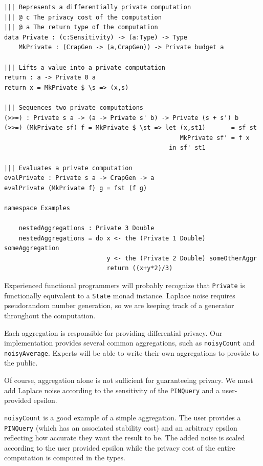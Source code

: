 \documentclass[12pt]{article}
\begin{document}
\begin{lstlisting}
||| Represents a differentially private computation
||| @ c The privacy cost of the computation
||| @ a The return type of the computation
data Private : (c:Sensitivity) -> (a:Type) -> Type
    MkPrivate : (CrapGen -> (a,CrapGen)) -> Private budget a

||| Lifts a value into a private computation
return : a -> Private 0 a
return x = MkPrivate $ \s => (x,s)

||| Sequences two private computations
(>>=) : Private s a -> (a -> Private s' b) -> Private (s + s') b
(>>=) (MkPrivate sf) f = MkPrivate $ \st => let (x,st1)       = sf st
                                                MkPrivate sf' = f x
                                             in sf' st1

||| Evaluates a private computation
evalPrivate : Private s a -> CrapGen -> a
evalPrivate (MkPrivate f) g = fst (f g)

namespace Examples

    nestedAggregations : Private 3 Double
    nestedAggregations = do x <- the (Private 1 Double) someAggregation
                            y <- the (Private 2 Double) someOtherAggr
                            return ((x+y*2)/3)
\end{lstlisting}

Experienced functional programmers will probably recognize that \texttt{Private} is functionally equivalent to a \texttt{State} monad instance.
Laplace noise requires pseudorandom number generation, so we are keeping track of a generator throughout the computation.

Each aggregation is responsible for providing differential privacy.
Our implementation provides several common aggregations, such as \texttt{noisyCount} and \texttt{noisyAverage}.
Experts will be able to write their own aggregations to provide to the public.

Of course, aggregation alone is not sufficient for guaranteeing privacy.
We must add Laplace noise according to the sensitivity of the \texttt{PINQuery} and a user-provided epsilon.

\texttt{noisyCount} is a good example of a simple aggregation.
The user provides a \texttt{PINQuery} (which has an associated stability cost) and an arbitrary epsilon reflecting how accurate they want the result to be.
The added noise is scaled according to the user provided epsilon while the privacy cost of the entire computation is computed in the types.
\end{document}

